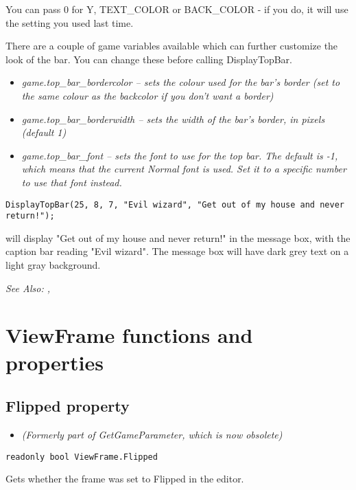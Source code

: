 You can pass 0 for Y, TEXT_COLOR or BACK_COLOR - if you do, it will use the setting you used
last time.

There are a couple of game variables available which can further customize the look of
the bar. You can change these before calling DisplayTopBar.

\begin{itemize}
\item \it{game.top_bar_bordercolor} -- sets the colour used for the bar's border (set to the same
colour as the backcolor if you don't want a border)
\item \it{game.top_bar_borderwidth} -- sets the width of the bar's border, in pixels (default 1)
\item \it{game.top_bar_font} -- sets the font to use for the top bar. The default is -1, which means
that the current Normal font is used. Set it to a specific number to use that font instead.
\end{itemize}

\begin{verbatim}
DisplayTopBar(25, 8, 7, "Evil wizard", "Get out of my house and never return!");
\end{verbatim}
will display "Get out of my house and never return!" in the message box, with the
caption bar reading "Evil wizard". The message box will have dark grey text on a light
gray background.

\it{See Also:} , 


\section{ViewFrame functions and properties}


\subsection{Flipped property}\label{ViewFrame.Flipped}%

\begin{itemize}
\item \it{(Formerly part of GetGameParameter, which is now obsolete)}
\end{itemize}

\begin{verbatim}
readonly bool ViewFrame.Flipped
\end{verbatim}
Gets whether the frame was set to Flipped in the editor.

